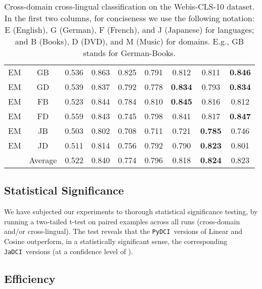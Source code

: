 \documentclass{article}
\newcommand{\jadci}{\texttt{JaDCI}}
\newcommand{\pydci}{\texttt{PyDCI}}
\begin{document}
\begin{table*}[ht!]
\begin{tabular}{|c|c||c|c|c||c|c||c|c|}
    EM         & GB          & 0.536         & 0.863         & 0.825 & 0.791    & 0.812           & 0.811          & \textbf{0.846} \\
    EM         & GD          & 0.539         & 0.837         & 0.792 & 0.778    & \textbf{0.834}  & 0.793          & \textbf{0.834} \\
    EM         & FB          & 0.523         & 0.844         & 0.784 & 0.810    & \textbf{0.845}  & 0.816          & 0.812          \\
    EM         & FD          & 0.559         & 0.843         & 0.745 & 0.798    & 0.841           & 0.817          & \textbf{0.847} \\
    EM         & JB          & 0.503         & 0.802         & 0.708 & 0.711    & 0.721           & \textbf{0.785} & 0.746          \\
    EM         & JD          & 0.511         & 0.814         & 0.756 & 0.792    & 0.790           & \textbf{0.823} & 0.801          \\ \hline \hline
                                & Average     & 0.522         & 0.840         & 0.774 & 0.796    & 0.818           & \textbf{0.824} & 0.823  \\\hline     
  \end{tabular}
\caption{Cross-domain cross-lingual classification on the
  Webis-CLS-10 dataset. In the first two columns, for conciseness we
  use the following notation: E (English), G (German), F (French), and
  J (Japanese) for languages; and B (Books), D (DVD), and M (Music)
  for domains. E.g., GB stands for German-Books.}
  \label{tab:webis2}
\end{table*}





\subsection{Statistical Significance}
\label{sec:stat}

\noindent We have subjected our experiments to thorough statistical
significance testing, by running a two-tailed t-test on paired
examples across all runs (cross-domain and/or cross-lingual). The test
reveals that the \pydci\ versions of Linear and Cosine outperform, in
a statistically significant sense, the corresponding \jadci\ versions
(at a confidence level of ).



\subsection{Efficiency}
\label{sec:efficiency}
\end{document}
